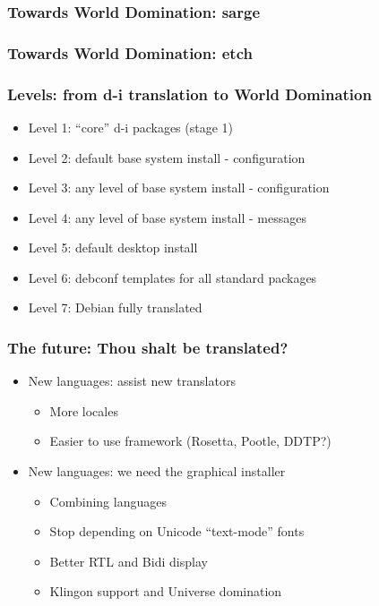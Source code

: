 \documentclass{beamer}
\begin{document}
\begin{frame}
  \frametitle{Towards World Domination: sarge}
\end{frame}

\begin{frame}
  \frametitle{Towards World Domination: etch}
\end{frame}

\begin{frame}
  \frametitle{Levels: from d-i translation to World Domination}
	\begin{itemize}[<+->]
	\item
		Level 1: ``core'' d-i packages (stage 1)
	\item
		Level 2: default base system install - configuration
	\item
		Level 3: any level of base system install - configuration
	\item
		Level 4: any level of base system install - messages
	\item
		Level 5: default desktop install
	\item
		Level 6: debconf templates for all standard packages
	\item
		Level 7: Debian fully translated
	\end{itemize}
\end{frame}

\begin{frame}
  \frametitle{The future: Thou shalt be translated?}
	\begin{itemize}
	\item<1->
		New languages: assist new translators
		\begin{itemize}
			\item<1->
				More locales
			\item<2->
				Easier to use framework (Rosetta, Pootle, DDTP?)
		\end{itemize}
	\item<3->
		New languages: we need the graphical installer
		\begin{itemize}
			\item<3->
				Combining languages
			\item<4->
				Stop depending on Unicode ``text-mode'' fonts
			\item<5->
				Better RTL and Bidi display
			\item<6->
				Klingon support and Universe domination
		\end{itemize}
	\end{itemize}
\end{frame}
\end{document}
